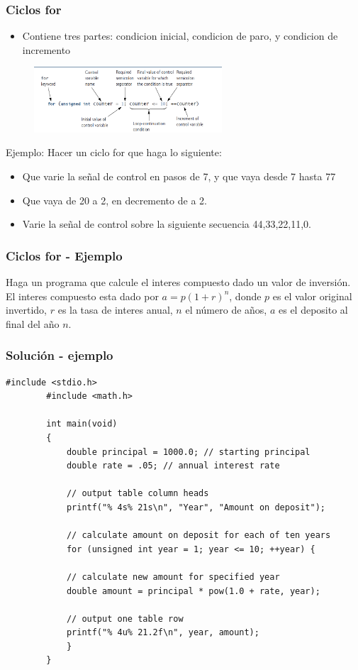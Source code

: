 \documentclass[10.5pt,scale=1.0,t,aspectratio=169,hyperref={pdfpagelabels=false}]{beamer}
\begin{document}
\begin{frame}
	\frametitle{Ciclos for}
	\begin{itemize}
		\item Contiene tres partes: condicion inicial, condicion de paro, y condicion de incremento
	\end{itemize}
	\begin{figure}
		\centering
		\includegraphics[width=7cm]{CicloFor}
	\end{figure}
	Ejemplo: Hacer un ciclo for que haga lo siguiente:
	\begin{itemize}
		\item Que varie la señal de control en pasos de 7, y que vaya desde 7 hasta 77
		\item Que vaya de 20 a 2, en decremento de a 2.
		\item Varie la señal de control sobre la siguiente secuencia 44,33,22,11,0.
	\end{itemize}
\end{frame}

\begin{frame}
	\frametitle{Ciclos for - Ejemplo}
	Haga un programa que calcule el interes compuesto dado un valor de inversión. El interes compuesto esta dado por $a=p(1+r)^n$, donde $p$ es el valor original invertido, $r$ es la tasa de interes anual, $n$ el número de años, $a$ es el deposito al final del año $n$.
\end{frame}

\begin{frame}[fragile]
	\frametitle{Solución - ejemplo}
		
	\begin{lstlisting}[style=CStyle]
		#include <stdio.h>
		#include <math.h>
		
		int main(void)
		{
			double principal = 1000.0; // starting principal
			double rate = .05; // annual interest rate
			
			// output table column heads
			printf("% 4s% 21s\n", "Year", "Amount on deposit");
			
			// calculate amount on deposit for each of ten years
			for (unsigned int year = 1; year <= 10; ++year) {
			
			// calculate new amount for specified year
			double amount = principal * pow(1.0 + rate, year);
			
			// output one table row
			printf("% 4u% 21.2f\n", year, amount);
			}
		}
	\end{lstlisting}
	
\end{frame}
\end{document}
